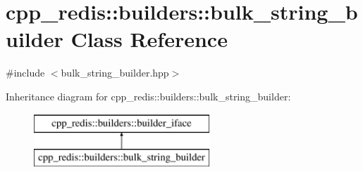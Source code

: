 \hypertarget{classcpp__redis_1_1builders_1_1bulk__string__builder}{}\section{cpp\+\_\+redis\+:\+:builders\+:\+:bulk\+\_\+string\+\_\+builder Class Reference}
\label{classcpp__redis_1_1builders_1_1bulk__string__builder}


{\ttfamily \#include $<$bulk\+\_\+string\+\_\+builder.\+hpp$>$}

Inheritance diagram for cpp\+\_\+redis\+:\+:builders\+:\+:bulk\+\_\+string\+\_\+builder\+:\begin{figure}[H]
\begin{center}
\leavevmode
\includegraphics[height=2.000000cm]{classcpp__redis_1_1builders_1_1bulk__string__builder}
\end{center}
\end{figure}
